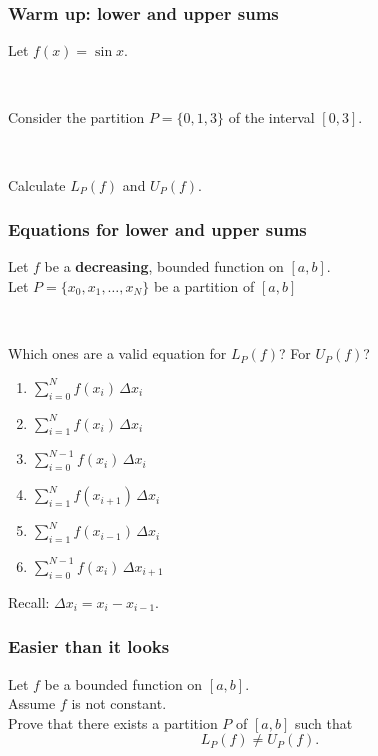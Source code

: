 \documentclass[14pt]{beamer}
\newcommand {\DS} [1] {${\displaystyle #1}$}
\newcommand{\setsize}[1]{\fontsize{#1}{#1}\selectfont} %
\newcommand{\smallerfont}{\setsize{13}} %
\begin{document}
\begin{frame}[t]
\frametitle{Warm up: lower and upper sums}


Let \DS{f(x) = \sin x}. 

\

Consider the partition \DS{P= \{0, 1, 3\}}   of the interval \DS{[0,3]}. 

\

Calculate \DS{L_P(f)} and \DS{U_P(f)}.


\end{frame}


\begin{frame}[t]
\smallerfont
\frametitle{Equations for lower and upper sums}  

Let $f$ be a {\bf decreasing}, bounded function on $[a,b]$. \\
Let \DS{P = \{x_0, x_1, \ldots, x_N\}} be a partition of $[a,b]$ 

\

Which ones are a valid equation for $L_P(f)$?  For $U_P(f)$?


	\begin{multicols}{3}
		\begin{enumerate}
			\item \DS{\sum_{i=0}^N  f(x_i) \, \Delta x_i}
			\item \DS{\sum_{i = 1}^N  f(x_i) \, \Delta x_i}
			\item \DS{\sum_{i = 0}^{N-1}  f(x_i) \, \Delta x_i}
			\item \DS{\sum_{i = 1}^N  f(x_{i+1}) \, \Delta x_i}	
			\item \DS{\sum_{i = 1}^N  f(x_{i-1}) \, \Delta x_i}
			\item \DS{\sum_{i = 0}^{N-1}  f(x_{i}) \, \Delta x_{i+1}}	
		\end{enumerate}
	\end{multicols}

Recall:  \DS{\Delta x_i = x_i - x_{i-1}}.


\end{frame}
\begin{frame}[t]
\frametitle{Easier than it looks}  	

Let $f$ be a bounded function on $[a,b]$. \\
	Assume $f$ is not constant. \\
	Prove that there exists a partition $P$ of $[a,b]$ such that
		$$
			L_P(f) \neq U_P(f).
		$$

\end{frame}
\end{document}
